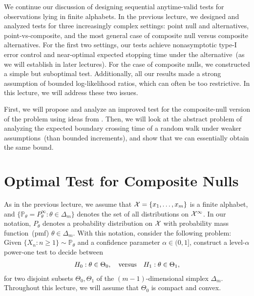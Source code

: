 \documentclass[12pt]{article}
\begin{document}
	\MakeScribeTop
We continue our discussion of designing sequential anytime-valid tests for observations lying in finite alphabets. In the previous lecture, we designed and analyzed tests for three increasingly complex settings: point null and alternatives, point-vs-composite, and the most general case of composite null versus composite alternatives. For the first two settings, our tests achieve nonasymptotic type-I error control and near-optimal expected stopping time under the alternative~(as we will establish in later lectures). For the case of composite nulls, we constructed a simple but suboptimal test. Additionally, all our results made a strong assumption of bounded log-likelihood ratios, which can often be too restrictive. In this lecture, we will address these two issues. 

First, we will propose and analyze an improved test for the composite-null version of the problem using ideas from \citet[Section~8]{wasserman2020universal}. Then, we will look at the abstract problem of analyzing the expected boundary crossing time of a random walk under weaker assumptions~(than bounded increments), and show that we can essentially obtain the same bound. 


\section{Optimal Test for Composite Nulls}
As in the previous lecture, we assume that ${\cal X} = \{x_1, \ldots, x_m\}$ is a finite alphabet, and $\{\mathbb{P}_\theta = P_\theta^{\infty}:\theta \in \Delta_m\}$ denotes the set of all \iid distributions on ${\cal X}^\infty$. In our notation, $P_\theta$ denotes a probability distribution on ${\cal X}$ with probability mass function~(pmf) $\theta \in \Delta_m$. With this notation, consider the following problem: Given $\{X_n: n\geq 1\} \sim \mathbb{P}_\theta$ and a confidence parameter $\alpha \in (0, 1]$, construct a level-$\alpha$ power-one test to decide between 
\begin{align}
    H_0: \theta \in \Theta_0, \quad \text{versus} \quad H_1: \theta \in \Theta_1,  \label{eq:composite-test-finite-alphabet}
\end{align}
for two disjoint subsets $\Theta_0, \Theta_1$ of the $(m-1)$-dimensional simplex $\Delta_m$. Throughout this lecture, we will assume that $\Theta_0$ is compact and convex. 
\end{document}
